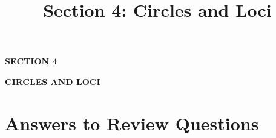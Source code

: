 \documentclass[11pt]{article}
\title{\textbf{Section 4: Circles and Loci}}
\author{}
\date{}
\begin{document}
\begin{titlepage}
\centering
\vspace*{4cm}
{\Huge\bfseries\color{sectionblue} SECTION 4\par}
\vspace{1cm}
{\LARGE\bfseries CIRCLES AND LOCI\par}
\end{titlepage}








\clearpage
\section*{Answers to Review Questions}

\end{document}
